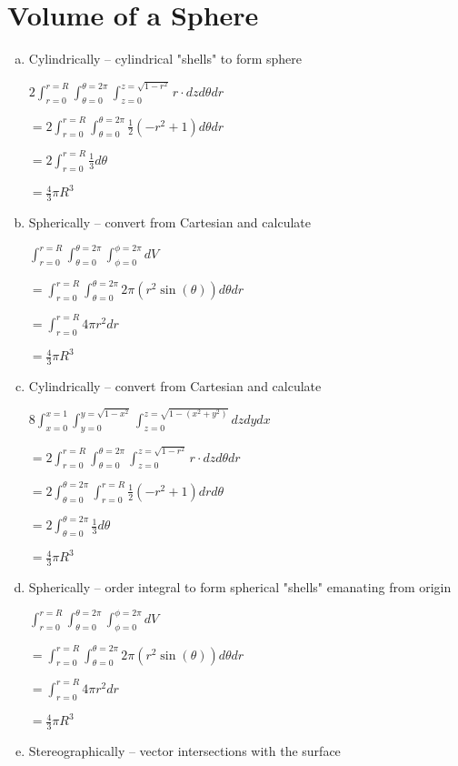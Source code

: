\documentclass{article}
\begin{document}
\section{Volume of a Sphere}
\begin{enumerate}[a.]
	\item Cylindrically -- cylindrical "shells" to form sphere

        $ 2\int_{r = 0}^{r = R} \int_{\theta = 0}^{\theta = 2\pi} \int_{z = 0}^{z = \sqrt{1-r^2}} r \cdot dz d\theta dr$

        $ = 2 \int_{r = 0}^{r = R} \int_{\theta = 0}^{\theta = 2\pi} \frac{1}{2}\left(-r^2+1\right)  d\theta dr$

        $ = 2 \int_{r = 0}^{r = R} \frac{1}{3} d\theta $

        $ = \frac{4}{3}\pi R^3 $

	\item Spherically -- convert from Cartesian and calculate

        $\int_{r=0}^{r=R}\int_{\theta=0}^{\theta=2\pi}\int_{\phi=0}^{\phi=2\pi} dV $

        $ = \int_{r=0}^{r=R}\int_{\theta=0}^{\theta=2\pi} 2\pi (r^2\sin(\theta))  d\theta dr $

        $ = \int_{r=0}^{r=R}4\pi r^2 dr $

        $ = \frac{4}{3}\pi R^3 $

	\item Cylindrically -- convert from Cartesian and calculate

        $8\int_{x = 0}^{x = 1} \int_{y = 0}^{y = \sqrt{1-x^2}} \int_{z = 0}^{z = \sqrt{1-(x^2+y^2)}} dz dy dx$

        $ = 2\int_{r = 0}^{r = R} \int_{\theta = 0}^{\theta = 2\pi} \int_{z = 0}^{z = \sqrt{1-r^2}} r \cdot dz d\theta dr$

        $ = 2 \int_{\theta = 0}^{\theta = 2\pi} \int_{r = 0}^{r = R} \frac{1}{2}\left(-r^2+1\right) dr d\theta$

        $ = 2 \int_{\theta = 0}^{\theta = 2\pi} \frac{1}{3} d\theta $

        $ = \frac{4}{3}\pi R^3 $

	\item Spherically -- order integral to form spherical "shells" emanating from origin

        $\int_{r=0}^{r=R}\int_{\theta=0}^{\theta=2\pi}\int_{\phi=0}^{\phi=2\pi} dV $

        $ = \int_{r=0}^{r=R}\int_{\theta=0}^{\theta=2\pi} 2\pi (r^2\sin(\theta))  d\theta dr $

        $ = \int_{r=0}^{r=R}4\pi r^2 dr $

        $ = \frac{4}{3}\pi R^3 $

	\item Stereographically -- vector intersections with the surface
\end{enumerate}
\end{document}
